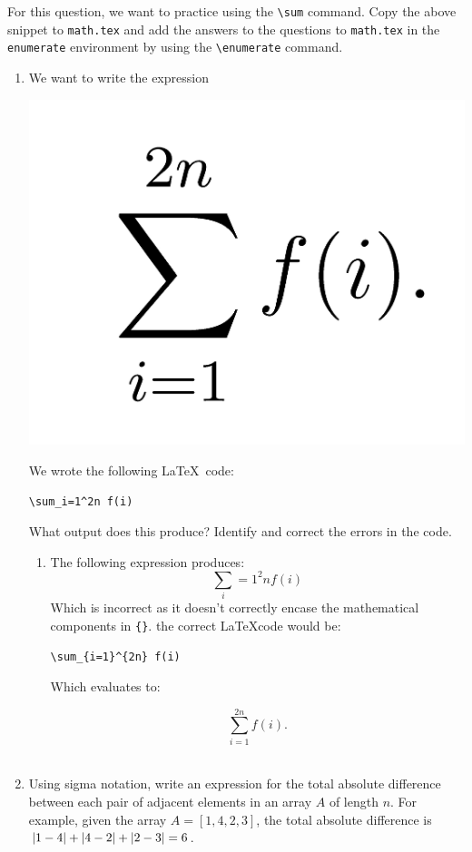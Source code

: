 \documentclass[12pt]{article}
\begin{document}
\begin{question}
For this question, we want to practice using the \verb|\sum| command.
Copy the above snippet to \texttt{math.tex} and add the answers to the questions to \texttt{math.tex} in the \verb|enumerate| environment by using the \verb|\enumerate| command.
\begin{enumerate}
\item We want to write the expression 

\begin{center}
\includegraphics{eqn.jpg}
\end{center}
    We wrote the following \LaTeX\ code:
    \begin{center}
    \verb|\sum_i=1^2n f(i)|
    \end{center}
    What output does this produce? Identify and correct the errors in the code. \\
    \begin{enumerate}
        \item The following expression produces: \[\sum_i=1^2n f(i)\]
        Which is incorrect as it doesn't correctly encase the mathematical components in \verb|{}|.
        the correct \LaTeX code would be: \\
        \begin{center}
        \verb|\sum_{i=1}^{2n} f(i)| \\
        \end{center}
        Which evaluates to: 
        \begin{center}
        \[\sum_{i=1}^{2n} f(i).\] \\
        \end{center}
        \newpage
    \end{enumerate}
    \item Using sigma notation, write an expression for the total absolute difference between each pair of adjacent elements in an array $A$ of length $n$. For example, given the array $A = [1, 4, 2, 3]$, the total absolute difference is $\lvert1-4\rvert + \lvert4-2\rvert + \lvert2-3\rvert = 6$.


\end{enumerate}
\end{question}
\end{document}
